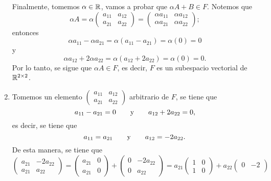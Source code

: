 \documentclass[11pt,a5]{aleph-examen}
\begin{document}
\begin{preguntas}
\begin{respuesta}
\begin{enumerate}
        Finalmente, tomemos $\alpha\in \mathbb{R}$, vamos a probar que $\alpha A+B \in F$. Notemos que 
        \[
            \alpha A = \alpha \begin{pmatrix}
                a_{11} & a_{12} \\
                a_{21} & a_{22}
            \end{pmatrix}  = \begin{pmatrix}
                \alpha a_{11} & \alpha a_{12} \\
                \alpha a_{21} & \alpha a_{22} 
            \end{pmatrix};
        \]
        entonces
        \[
            \alpha a_{11} - \alpha a_{21}  = \alpha (a_{11}-a_{21})  =  \alpha(0) = 0
        \]
        y
        \[
            \alpha a_{12} + 2\alpha a_{22} = \alpha (a_{12} + 2a_{22})  = \alpha(0) = 0.
        \]
        Por lo tanto, se sigue que $\alpha A \in F$, es decir, $F$ es un subespacio vectorial de $\mathbb{R}^{2\times 2}$.
    \item 
        Tomemos un elemento $\begin{pmatrix}
                a_{11} & a_{12} \\
                a_{21} & a_{22}
        \end{pmatrix}$ arbitrario de $F$, se tiene que
        \[
            a_{11} - a_{21} = 0 \qquad\text{y}\qquad a_{12} + 2a_{22} = 0,
        \]
        es decir, se tiene que 
        \[
            a_{11} =  a_{21} \qquad\text{y}\qquad a_{12} = -2 a_{22}.
        \]
        De esta manera, se tiene que 
        \[
            \begin{pmatrix}
                a_{21} & -2 a_{22} \\
                a_{21} & a_{22}
            \end{pmatrix} = \begin{pmatrix}
                a_{21} & 0 \\
                a_{21} & 0
            \end{pmatrix} + \begin{pmatrix}
                0 & -2a_{22}\\
                0 & a_{22}
            \end{pmatrix} = a_{21} \begin{pmatrix}
                1 & 0 \\
                1 & 0 
            \end{pmatrix} + a_{22} \begin{pmatrix}
                0 & -2 \\

\end{pmatrix}\]
\end{enumerate}
\end{respuesta}
\end{preguntas}
\end{document}
